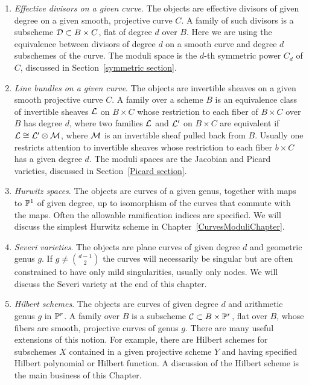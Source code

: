\begin{enumerate}\label{list of moduli problems}

\item \emph{Effective divisors on a given curve}. The objects are effective divisors of given degree on a given smooth, projective curve $C$. A family of such divisors is a subscheme ${\mathcal D} \subset B \times C$, flat of degree $d$ over $B$. 
Here we are using
the equivalence between divisors of degree $d$ on a smooth curve and degree $d$ subschemes of the curve. The moduli space is the $d$-th symmetric power $C_d$ of $C$, discussed in Section~\ref{symmetric section}.

\item \emph{Line bundles on a given curve}. The objects are invertible sheaves on a given smooth projective curve $C$. A family over a scheme $B$ is an equivalence class of invertible sheaves ${\mathcal L}$ on $B \times C$ whose restriction to each fiber of $B \times C$ over $B$ has degree $d$, where two families ${\mathcal L}$ and ${\mathcal L}'$ on $B \times C$ are equivalent if ${\mathcal L}\cong {\mathcal L}' \otimes {\mathcal M}$, where ${\mathcal M}$ is  an invertible sheaf pulled back from $B$. Usually one restricts attention to invertible sheaves 
whose restriction to each fiber $b\times C$ has a given degree $d$.
The moduli spaces are the Jacobian and Picard varieties, discussed in Section~\ref{Picard section}.

\item \emph{Hurwitz spaces}. The objects are curves of a given genus, together with maps to ${\mathbb P}^1$ of given degree, up to isomorphism of the curves that commute with the maps. Often the allowable ramification indices are specified. We will discuss the simplest Hurwitz scheme in Chapter~\ref{CurvesModuliChapter}.

\item \emph{Severi varieties}. The objects are plane curves
of given degree $d$ and geometric genus $g$. If $g \neq {d-1\choose 2}$
the curves will necessarily be singular but are often
constrained to have only mild singularities, usually only nodes. We will discuss the Severi variety at the end of this chapter.

\item \emph{Hilbert schemes}. The objects are curves of given degree $d$ and arithmetic genus $g$ in ${\mathbb P}^r$.  A family over $B$ is a subscheme $\mathcal C \subset B \times {\mathbb P}^r$, flat over $B$,  whose fibers are smooth, projective curves of genus $g$. There are many useful extensions of this notion. For example, there are Hilbert schemes
for subschemes $X$ contained in a given projective scheme $Y$ and having specified Hilbert polynomial or Hilbert function. 
A discussion of the Hilbert scheme is the main business of this Chapter.


\end{enumerate}

